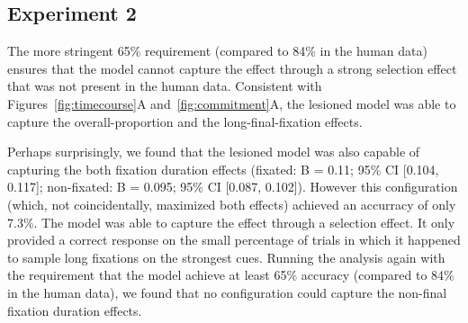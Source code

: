 \subsection{Experiment 2}

The more stringent 65\% requirement (compared to 84\% in the human data) ensures that the model cannot capture the effect through a strong selection effect that was not present in the human data. Consistent with Figures~\ref{fig:timecourse}A and~\ref{fig:commitment}A, the lesioned model was able to capture the overall-proportion and the long-final-fixation effects.

Perhaps surprisingly, we found that the lesioned model was also capable of capturing the both fixation duration effects (fixated: B = 0.11; 95\% CI [0.104, 0.117]; non-fixated: B = 0.095; 95\% CI [0.087, 0.102]). However this configuration (which, not coincidentally, maximized both effects) achieved an accurracy of only 7.3\%. The model was able to capture the effect through a selection effect. It only provided a correct response on the small percentage of trials in which it happened to sample long fixations on the strongest cues. Running the analysis again with the requirement that the model achieve at least 65\% accuracy (compared to 84\% in the human data), we found that no configuration could capture the non-final fixation duration effects.

